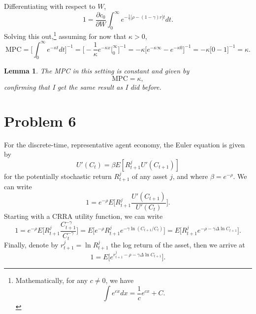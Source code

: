 \documentclass[11pt]{extarticle}
\theoremstyle{plain}
\newtheorem{lem}[thm]{Lemma}
\theoremstyle{definition}
\begin{document}
Differentiating with respect to $W$, 
\begin{equation*}
	1 = \frac{\partial c_0}{\partial W} \int_0^\infty e^{- \frac{1}{\gamma} \big[ \rho - (1-\gamma) r \big] t }  dt.
\end{equation*}
Solving this out,\footnote{
	Mathematically, for any $c \neq 0$, we have 
	\begin{equation*}
		\int e^{c x} dx = \frac{1}{c} e^{cx} + C. 
	\end{equation*}
} assuming for now that $\kappa > 0$, 
\begin{equation*}
	\text{MPC} = \bigg[\int_0^\infty e^{- \kappa t }  dt\bigg]^{-1}  = \bigg[ - \frac{1}{\kappa} e^{- \kappa x}  \bigg|_0^\infty  \bigg]^{-1}  = - \kappa \bigg[e^{- \kappa \infty }  - e^{- \kappa 0}  \bigg]^{-1} = - \kappa \bigg[0 - 1  \bigg]^{-1} = \kappa. 
\end{equation*}



\vspace{3mm}
\noindent
\begin{lem}
	The MPC in this setting is constant and given by
	\begin{equation*}
		\text{MPC} = \kappa,
	\end{equation*}
	confirming that I get the same result as I did before. 
\end{lem}




\vspace{10mm}
\section*{Problem 6}


For the discrete-time, representative agent economy, the Euler equation is given by
\begin{equation*}
	U'(C_t) = \beta E[R_{t+1}^j U'(C_{t+1})]
\end{equation*}
for the potentially stochastic return $R_{t+1}^j$ of any asset $j$, and where $\beta = e^{-\rho}$. We can write 
\begin{equation*}
	1 = e^{-\rho} E\bigg[R_{t+1}^j \frac{U'(C_{t+1})}{U'(C_t)} \bigg].
\end{equation*}
Starting with a CRRA utility function, we can write 
\begin{equation*}
	1 = e^{-\rho} E\bigg[R_{t+1}^j \frac{C_{t+1}^{-\gamma}}{C_t^{-\gamma}} \bigg] = E\bigg[e^{-\rho}  R_{t+1}^j e^{-\gamma \ln(C_{t+1} / C_t)} \bigg] = E\bigg[ R_{t+1}^j e^{- \rho -\gamma  \Delta \ln  C_{t+1}} \bigg].
\end{equation*}
Finally, denote by $r_{t+1}^j = \ln R_{t+1}^j$ the log return of the asset, then we arrive at 
\begin{equation*}
	1 = E\bigg[ e^{r_{t+1}^j - \rho -\gamma \Delta \ln  C_{t+1}} \bigg].
\end{equation*}
\end{document}
